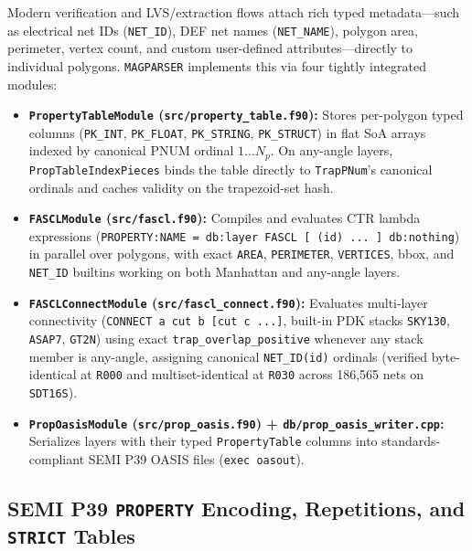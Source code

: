 Modern verification and LVS/extraction flows attach rich typed metadata---such as electrical net IDs (\texttt{NET\_ID}), DEF net names (\texttt{NET\_NAME}), polygon area, perimeter, vertex count, and custom user-defined attributes---directly to individual polygons. \texttt{MAGPARSER} implements this via four tightly integrated modules:
\begin{itemize}
  \item \textbf{\texttt{PropertyTableModule} (\texttt{src/property\_table.f90}):} Stores per-polygon typed columns (\texttt{PK\_INT}, \texttt{PK\_FLOAT}, \texttt{PK\_STRING}, \texttt{PK\_STRUCT}) in flat SoA arrays indexed by canonical PNUM ordinal $1 \dots N_p$. On any-angle layers, \texttt{PropTableIndexPieces} binds the table directly to \texttt{TrapPNum}'s canonical ordinals and caches validity on the trapezoid-set hash.
  \item \textbf{\texttt{FASCLModule} (\texttt{src/fascl.f90}):} Compiles and evaluates CTR lambda expressions (\texttt{PROPERTY:NAME = db:layer FASCL [ (id) ... ] db:nothing}) in parallel over polygons, with exact \texttt{AREA}, \texttt{PERIMETER}, \texttt{VERTICES}, bbox, and \texttt{NET\_ID} builtins working on both Manhattan and any-angle layers.
  \item \textbf{\texttt{FASCLConnectModule} (\texttt{src/fascl\_connect.f90}):} Evaluates multi-layer connectivity (\texttt{CONNECT a cut b [cut c ...]}, built-in PDK stacks \texttt{SKY130}, \texttt{ASAP7}, \texttt{GT2N}) using exact \texttt{trap\_overlap\_positive} whenever any stack member is any-angle, assigning canonical \texttt{NET\_ID(id)} ordinals (verified byte-identical at \texttt{R000} and multiset-identical at \texttt{R030} across 186,565 nets on \texttt{SDT16S}).
  \item \textbf{\texttt{PropOasisModule} (\texttt{src/prop\_oasis.f90}) + \texttt{db/prop\_oasis\_writer.cpp}:} Serializes layers with their typed \texttt{PropertyTable} columns into standards-compliant SEMI P39 OASIS files (\texttt{exec oasout}).
\end{itemize}

\subsection{SEMI P39 \texttt{PROPERTY} Encoding, Repetitions, and \texttt{STRICT} Tables}

